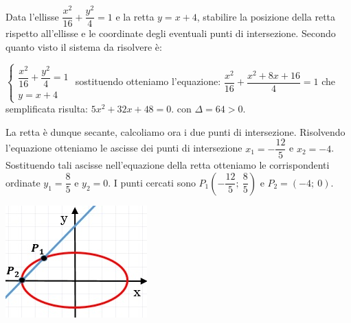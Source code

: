 \begin{esempio} Data l'ellisse $ \dfrac{x^{2}}{16}+  
\dfrac{y^{2}}{4} =1$ e la retta $y=x+4$, stabilire la posizione della retta 
rispetto all'ellisse e le coordinate degli eventuali punti di intersezione. 
Secondo quanto visto il sistema da risolvere è:

$\begin{cases}  \dfrac{x^{2}}{16}+\dfrac{y^{2}}{4}=1   \\ y=x+4  
\end{cases}$  
sostituendo otteniamo l'equazione: $ 
\dfrac{x^{2}}{16}+\dfrac{x^{2}+8x+16}{4}=1$ che semplificata risulta: $5 
x^{2} +32x+48=0$.
con $ \Delta =64>0$. 

\begin{minipage}{.65\textwidth}
  La retta è dunque secante, calcoliamo ora i due punti di 
intersezione. 
  Risolvendo l'equazione otteniamo le ascisse dei punti di 
intersezione $ x_{1} =- \dfrac{12}{5} $ e $ x_{2} =-4$. Sostituendo tali 
ascisse nell'equazione della retta otteniamo le corrispondenti ordinate $ 
y_{1} =\dfrac{8}{5}$ e $ y_{2} =0$. I punti cercati sono $ P_{1}  
\left(-\dfrac{12}{5};~ \dfrac{8}{5}\right) $ e $ P_{2} =(-4;~0)$.
\end{minipage}
\hspace{.2cm}
\begin{minipage}{.3\textwidth}
  \includegraphics[width=\textwidth]{img/esempioposizione1.jpg}
\end{minipage}
\end{esempio}
 
